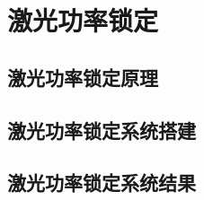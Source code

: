 
\chapter[激光功率锁定]{激光功率锁定}

\section[激光功率锁定原理]{激光功率锁定原理}

\section[激光功率锁定系统搭建]{激光功率锁定系统搭建}

\section[激光功率锁定系统结果]{激光功率锁定系统结果}

